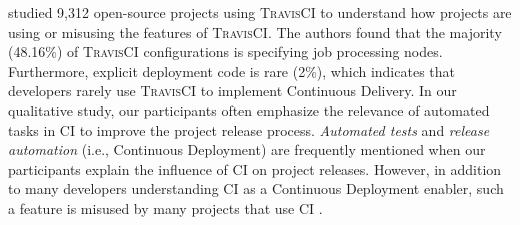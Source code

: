\cite{gallaba2018use} studied 9,312 open-source projects using \textsc{TravisCI} to understand how projects are using or misusing the features of \textsc{TravisCI}. The authors found that the majority (48.16\%) of \textsc{TravisCI} configurations is specifying job processing nodes. Furthermore, explicit deployment code is rare (2\%), which indicates that developers rarely use \textsc{TravisCI} to implement Continuous Delivery. In our qualitative study,  our participants often emphasize the relevance of automated tasks in CI to improve the project release process. \textit{Automated tests} and \textit{release automation} (i.e., Continuous Deployment) are frequently mentioned when our participants explain the influence of CI on project releases. However, in addition to many developers understanding CI as a Continuous Deployment enabler, such a feature is misused by many projects that use CI \citep{gallaba2018use}.


